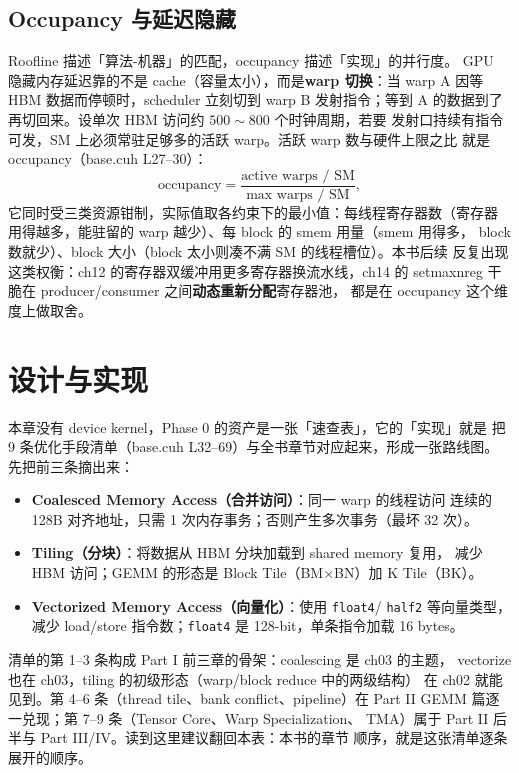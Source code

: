 \subsection{Occupancy 与延迟隐藏}

Roofline 描述「算法-机器」的匹配，occupancy 描述「实现」的并行度。
GPU 隐藏内存延迟靠的不是 cache（容量太小），而是\textbf{warp 切换}：当
warp A 因等 HBM 数据而停顿时，scheduler 立刻切到 warp B 发射指令；等到
A 的数据到了再切回来。设单次 HBM 访问约 $500 \sim 800$ 个时钟周期，若要
发射口持续有指令可发，SM 上必须常驻足够多的活跃 warp。活跃 warp 数与硬件上限之比
就是 occupancy（base.cuh L27--30）：
\begin{equation}
  \mathrm{occupancy} = \frac{\text{active warps / SM}}
                            {\text{max warps / SM}},
\end{equation}
它同时受三类资源钳制，实际值取各约束下的最小值：每线程寄存器数（寄存器
用得越多，能驻留的 warp 越少）、每 block 的 smem 用量（smem 用得多，
block 数就少）、block 大小（block 太小则凑不满 SM 的线程槽位）。本书后续
反复出现这类权衡：ch12 的寄存器双缓冲用更多寄存器换流水线，ch14 的
setmaxnreg 干脆在 producer/consumer 之间\textbf{动态重新分配}寄存器池，
都是在 occupancy 这个维度上做取舍。

\section{设计与实现}

本章没有 device kernel，Phase 0 的资产是一张「速查表」，它的「实现」就是
把 9 条优化手段清单（base.cuh L32--69）与全书章节对应起来，形成一张路线图。
先把前三条摘出来：

\begin{itemize}
\item \textbf{Coalesced Memory Access（合并访问）}：同一 warp 的线程访问
  连续的 128B 对齐地址，只需 1 次内存事务；否则产生多次事务（最坏 32 次）。
\item \textbf{Tiling（分块）}：将数据从 HBM 分块加载到 shared memory 复用，
  减少 HBM 访问；GEMM 的形态是 Block Tile（BM$\times$BN）加 K Tile（BK）。
\item \textbf{Vectorized Memory Access（向量化）}：使用 \texttt{float4}/
  \texttt{half2} 等向量类型，减少 load/store 指令数；\texttt{float4} 是
  128-bit，单条指令加载 16 bytes。
\end{itemize}

清单的第 1--3 条构成 Part I 前三章的骨架：coalescing 是 ch03 的主题，
vectorize 也在 ch03，tiling 的初级形态（warp/block reduce 中的两级结构）
在 ch02 就能见到。第 4--6 条（thread tile、bank conflict、pipeline）在
Part II GEMM 篇逐一兑现；第 7--9 条（Tensor Core、Warp Specialization、
TMA）属于 Part II 后半与 Part III/IV。读到这里建议翻回本表：本书的章节
顺序，就是这张清单逐条展开的顺序。

